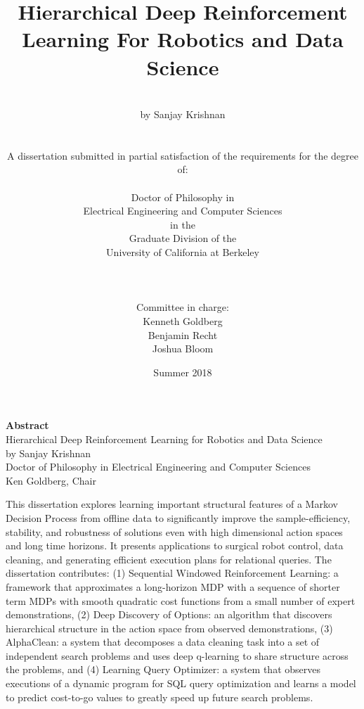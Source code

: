 \documentclass[oneside,12pt]{book} %
\title{Hierarchical Deep Reinforcement Learning For Robotics and Data Science}
\author
{\\
\normalsize{by Sanjay Krishnan}\\
\\
\\
\normalsize{A dissertation submitted in partial satisfaction of the
requirements for the degree of:}\\
\\
\normalsize{Doctor of Philosophy in}\\
\normalsize{Electrical Engineering and Computer Sciences}\\
\normalsize{in the}\\
\normalsize{Graduate Division of the}\\
\normalsize{University of California at Berkeley}\\
\\
\\
\\
\normalsize{Committee in charge: }\\
\normalsize{Kenneth Goldberg}\\
\normalsize{Benjamin Recht}\\
\normalsize{Joshua Bloom}\\
}
\date{Summer 2018}
\begin{document}
 




\maketitle 






{\centering \textbf{Abstract} \\ 
Hierarchical Deep Reinforcement Learning for Robotics and Data Science \\ \vspace{0.5em}
by Sanjay Krishnan \\ 
Doctor of Philosophy in Electrical Engineering and Computer Sciences \\
Ken Goldberg, Chair\\
\vspace{1.5em}}

This dissertation explores learning important structural features of a Markov Decision Process from offline data to significantly improve the sample-efficiency, stability, and robustness of solutions even with high dimensional action spaces and long time horizons.
It presents applications to surgical robot control, data cleaning, and generating efficient execution plans for relational queries. 
The dissertation contributes: (1) Sequential Windowed Reinforcement Learning: a framework that approximates a long-horizon MDP with a sequence of shorter term MDPs with smooth quadratic cost functions from a small number of expert demonstrations, (2) Deep Discovery of Options: an algorithm that discovers hierarchical structure in the action space from observed demonstrations, (3) AlphaClean: a system that decomposes a data cleaning task into a set of independent search problems and uses deep q-learning to share structure across the problems, and (4) Learning Query Optimizer: a system that observes executions of a dynamic program for SQL query optimization and learns a model to predict cost-to-go values to greatly speed up future search problems. 

\tableofcontents
\end{document}
